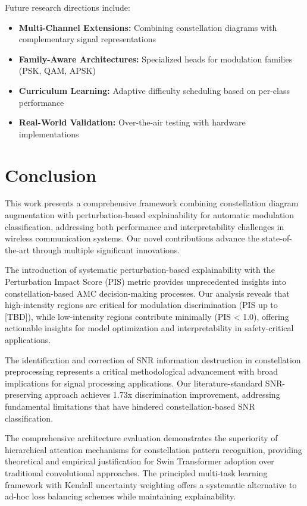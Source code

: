 \documentclass{ELSP}
\begin{document}
{{Future research directions include:
\begin{itemize}
    \item \textbf{Multi-Channel Extensions:} Combining constellation diagrams with complementary signal representations
    \item \textbf{Family-Aware Architectures:} Specialized heads for modulation families (PSK, QAM, APSK)
    \item \textbf{Curriculum Learning:} Adaptive difficulty scheduling based on per-class performance
    \item \textbf{Real-World Validation:} Over-the-air testing with hardware implementations
\end{itemize}

\section{Conclusion}

This work presents a comprehensive framework combining constellation diagram augmentation with perturbation-based explainability for automatic modulation classification, addressing both performance and interpretability challenges in wireless communication systems. Our novel contributions advance the state-of-the-art through multiple significant innovations.

The introduction of systematic perturbation-based explainability with the Perturbation Impact Score (PIS) metric provides unprecedented insights into constellation-based AMC decision-making processes. Our analysis reveals that high-intensity regions are critical for modulation discrimination (PIS up to [TBD]), while low-intensity regions contribute minimally (PIS < 1.0), offering actionable insights for model optimization and interpretability in safety-critical applications.

The identification and correction of SNR information destruction in constellation preprocessing represents a critical methodological advancement with broad implications for signal processing applications. Our literature-standard SNR-preserving approach achieves 1.73x discrimination improvement, addressing fundamental limitations that have hindered constellation-based SNR classification.

The comprehensive architecture evaluation demonstrates the superiority of hierarchical attention mechanisms for constellation pattern recognition, providing theoretical and empirical justification for Swin Transformer adoption over traditional convolutional approaches. The principled multi-task learning framework with Kendall uncertainty weighting offers a systematic alternative to ad-hoc loss balancing schemes while maintaining explainability.

}}
\end{document}
